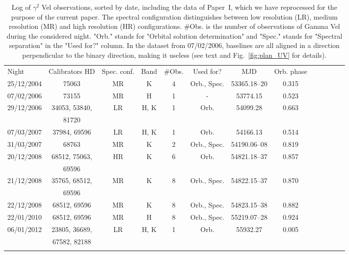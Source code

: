 \documentclass[usenatbib]{mnras}%
\begin{document}
\begin{table*}
  \caption{Log of $\gamma^2$ Vel observations, sorted by date, including the data of Paper~I, which we have reprocessed for the purpose of the current paper. The spectral configuration distinguishes between low resolution (LR), medium resolution (MR) and high resolution (HR) configurations. \#Obs. is the number of observations of Gamma Vel during the considered night. "Orb." stands for "Orbital solution determination" and  "Spec." stands for "Spectral separation" in the "Used for?" column.  In the dataset from 07/02/2006, baselines are all aligned in a direction perpendicular to the binary direction, making it useless (see text and Fig.~\ref{fig:plan_UV} for details).}
  \label{tab:logObs}
  \centering
  \begin{tabular}{lcccccccccccc}
    \hline
    \noalign{\smallskip}
    Night & Calibrators HD & Spec. conf. & Band &  \#Obs. & Used for? & MJD & Orb. phase \\ 
    \noalign{\smallskip}
    \hline
    \noalign{\smallskip}
    25/12/2004 & 75063         & MR & K    & 4 & Orb., Spec. & 53365.18--20 & 0.315 \\
    07/02/2006 & 73155         & MR & H    & 1 & -           &53774.15 & 0.523 \\
    29/12/2006 & 34053, 53840, & LR & H, K & 1 & Orb.        & 54099.28 & 0.663 \\
     & 81720  \\
    07/03/2007 & 37984, 69596  & LR & H, K & 1 & Orb.        & 54166.13 & 0.514 \\
    31/03/2007 & 68763         & MR & K    & 2 & Orb., Spec. & 54190.06--08 & 0.819 \\
    20/12/2008 & 68512, 75063, & HR & K    & 6 & Orb.        & 54821.18--37 & 0.857 \\
     & 69596  \\
    21/12/2008 & 35765, 68512, & MR & K    & 8 & Orb., Spec. & 54822.15--37 & 0.870 \\
      & 69596   \\
    22/12/2008 & 68512, 69596  & MR & K    & 8 & Orb., Spec. & 54823.15--38 & 0.882 \\
    22/01/2010 & 68512, 69596  & MR & H    & 8 & Orb., Spec. & 55219.07--28 & 0.924 \\
    06/01/2012 & 23805, 36689, & LR & H, K & 1 & Orb.        & 55932.27 & 0.005 \\
     & 67582, 82188 \\
    \noalign{\smallskip}
    \hline
  \end{tabular}
\end{table*}
\end{document}

